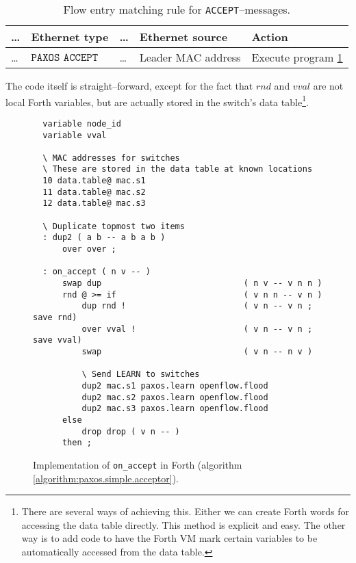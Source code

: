 \begin{table}[H]
  \begin{tabular}{l|l|l|l|l|}
    \hline
      \dots &
      \textbf{Ethernet type} &
      \dots &
      \textbf{Ethernet source} &
      \textbf{Action}
      \\
    \hline
      \dots &
      $\texttt{PAXOS ACCEPT}$
      & \dots
      & Leader MAC address
      & Execute program \ref{program:forth.on-accept}
      \\
    \hline
  \end{tabular}
  \caption{Flow entry matching rule for \texttt{ACCEPT}--messages.}
  \label{table:matching.simple.accept}
\end{table}

The code itself is straight--forward, except for the fact that $rnd$ and
$vval$ are not local Forth variables, but are actually stored in the
switch's data table\footnote{There are several ways of achieving this.
Either we can create Forth words for accessing the data table directly.
This method is explicit and easy.  The other way is to add code to have
the Forth VM mark certain variables to be automatically accessed from the
data table.}.

\begin{figure}[H]
  \centering
  \begin{Verbatim}
  variable node_id
  variable vval

  \ MAC addresses for switches
  \ These are stored in the data table at known locations
  10 data.table@ mac.s1
  11 data.table@ mac.s2
  12 data.table@ mac.s3

  \ Duplicate topmost two items
  : dup2 ( a b -- a b a b )
      over over ;

  : on_accept ( n v -- )
      swap dup                             ( n v -- v n n )
      rnd @ >= if                          ( v n n -- v n )
          dup rnd !                        ( v n -- v n ; save rnd)
          over vval !                      ( v n -- v n ; save vval)
          swap                             ( v n -- n v )

          \ Send LEARN to switches
          dup2 mac.s1 paxos.learn openflow.flood
          dup2 mac.s2 paxos.learn openflow.flood
          dup2 mac.s3 paxos.learn openflow.flood
      else
          drop drop ( v n -- )
      then ;
  \end{Verbatim}
  \caption{Implementation of \texttt{on\_{}accept} in Forth
            (algorithm \ref{algorithm:paxos.simple.acceptor}).}
  \label{program:forth.on-accept}
\end{figure}

